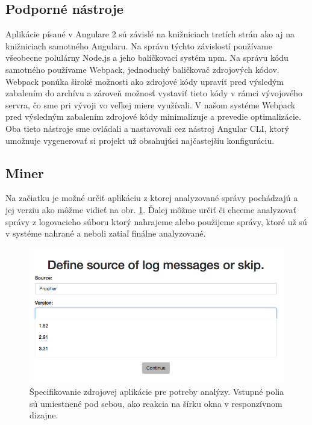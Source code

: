 \subsection{Podporné nástroje}
Aplikácie písané v Angulare 2 sú závislé na knižniciach tretích strán ako aj na knižniciach samotného Angularu. Na správu týchto závislostí používame všeobecne polulárny Node.js a jeho balíčkovací systém npm. Na správu kódu samotného používame Webpack, jednoduchý baličkovač zdrojových kódov. Webpack ponúka široké možnosti ako zdrojové kódy upraviť pred výsledým zabalením do archívu a zároveň možnosť vystaviť tieto kódy v rámci vývojového servra, čo sme pri vývoji vo veľkej miere využívali. V našom systéme Webpack pred výsledným zabalením zdrojové kódy minimalizuje a prevedie optimalizácie. Oba tieto nástroje sme ovládali a nastavovali cez nástroj Angular CLI, ktorý umožnuje vygenerovať si projekt už obsahujúci najčastejšiu konfiguráciu. 


\subsection{Miner}
Na začiatku je možné určiť aplikáciu z ktorej analyzované správy pochádzajú a jej verziu ako môžme vidieť na obr. \ref{fig:miner-source}. Ďalej môžme určiť či chceme analyzovať správy z  logovacieho súboru ktorý nahrajeme alebo použijeme správy, ktoré už sú v systéme nahrané a neboli zatiaľ finálne analyzované.

\begin{figure}[htbp]
 \centering 
 \begin{minipage}{\linewidth}
 	\centering
 	\includegraphics[width=\textwidth]{Images/thesis-miner-source.png}	
 \end{minipage}
  \caption{Špecifikovanie zdrojovej aplikácie pre potreby analýzy. Vstupné polia sú umiestnené pod sebou, ako reakcia na šírku okna v responzívnom dizajne.}
  \label{fig:miner-source}
\end{figure}

